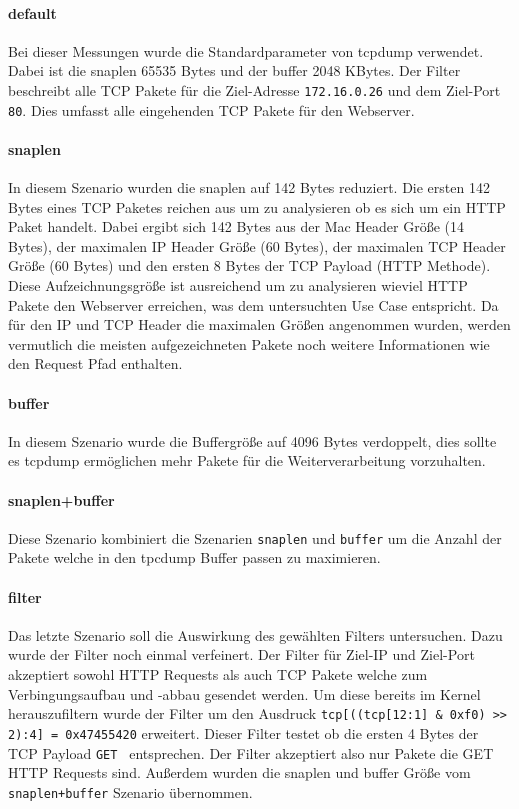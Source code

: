 \paragraph{default} Bei dieser Messungen wurde die Standardparameter von tcpdump
verwendet. Dabei ist die snaplen 65535 Bytes und der buffer 2048 KBytes. Der Filter
beschreibt alle TCP Pakete für die Ziel-Adresse \texttt{172.16.0.26} und dem Ziel-Port
\texttt{80}. Dies umfasst alle eingehenden TCP Pakete für den Webserver.

\paragraph{snaplen} In diesem Szenario wurden die snaplen auf 142 Bytes
reduziert. Die ersten 142 Bytes eines TCP Paketes reichen aus um zu analysieren
ob es sich um ein HTTP Paket handelt.  Dabei ergibt sich 142 Bytes aus der Mac
Header Größe (14 Bytes), der maximalen IP Header Größe (60 Bytes), der
maximalen TCP Header Größe (60 Bytes) und den ersten 8 Bytes der TCP Payload
(HTTP Methode). Diese Aufzeichnungsgröße ist ausreichend um zu analysieren
wieviel HTTP Pakete den Webserver erreichen, was dem untersuchten Use Case
entspricht. Da für den IP und TCP Header die maximalen Größen angenommen
wurden, werden vermutlich die meisten aufgezeichneten Pakete noch weitere
Informationen wie den Request Pfad enthalten.

\paragraph{buffer} In diesem Szenario wurde die Buffergröße auf 4096 Bytes
verdoppelt, dies sollte es tcpdump ermöglichen mehr Pakete für die
Weiterverarbeitung vorzuhalten.

\paragraph{snaplen+buffer} Diese Szenario kombiniert die Szenarien
\texttt{snaplen} und \texttt{buffer} um die Anzahl der Pakete welche in den
tpcdump Buffer passen zu maximieren.

\paragraph{filter} Das letzte Szenario soll die Auswirkung des gewählten
Filters untersuchen. Dazu wurde der Filter noch einmal verfeinert. Der Filter
für Ziel-IP und Ziel-Port akzeptiert sowohl HTTP Requests als auch TCP Pakete
welche zum Verbingungsaufbau und -abbau gesendet werden. Um diese bereits im
Kernel herauszufiltern wurde der Filter um den Ausdruck \texttt{tcp[((tcp[12:1]
\& 0xf0) >> 2):4] = 0x47455420} erweitert. Dieser Filter testet ob die ersten 4
Bytes der TCP Payload \glqq{}\texttt{GET }\grqq{} entsprechen.  Der
Filter akzeptiert also nur Pakete die GET HTTP Requests sind. Außerdem wurden
die snaplen und buffer Größe vom \texttt{snaplen+buffer} Szenario übernommen.

